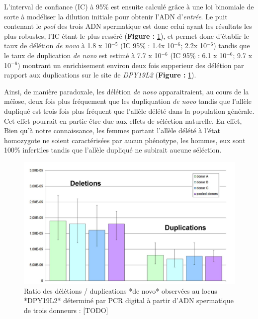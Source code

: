 \documentclass[12pt,twoside]{reedthesis}
\theoremstyle{definition}
\theoremstyle{definition}
\theoremstyle{remark}
\begin{document}
  L'interval de confiance (IC) à 95\% est ensuite calculé grâce à une loi
  binomiale de sorte à modéliser la dilution initiale pour obtenir l'ADN
  d'\emph{entrée}. Le puit contenant le \emph{pool} des trois ADN
  spermatique est donc celui ayant les résultats les plus robustes, l'IC
  étant le plus resséré (\textbf{Figure : }\ref{fig:dupdelrate}), et
  permet donc d'établir le taux de délétion \emph{de novo} à 1.8 x
  10\(^{-5}\) (IC 95\% : 1.4x 10\(^{-6}\); 2.2x 10\(^{-6}\)) tandis que le
  taux de duplication \emph{de novo} est estimé à 7.7 x 10\(^{-6}\) (IC
  95\% : 6.1 x 10\(^{-6}\); 9.7 x 10\(^{-6}\)) montrant un enrichisement
  environ deux fois supperieur des délétion par rapport aux duplications
  sur le site de \emph{DPY19L2} (\textbf{Figure : }\ref{fig:dupdelrate}).
  
  Ainsi, de manière paradoxale, les délétion \emph{de novo}
  apparaitraient, au cours de la méïose, deux fois plus fréquement que les
  dupliquation \emph{de novo} tandis que l'allèle dupliqué est trois fois
  plus fréquent que l'allèle délété dans la population générale. Cet effet
  pourrait en partie être due aux effets de séléction naturelle. En effet,
  Bien qu'à notre connaissance, les femmes portant l'allèle délété à
  l'état homozygote ne soient caractérisées par aucun phénotype, les
  hommes, eux sont 100\% infertiles tandis que l'allèle dupliqué ne
  subirait aucune séléction.
  
  \begin{figure}
  
  {\centering \includegraphics[scale=0.38]{figure/globo_du_del_rate} 
  
  }
  
  \caption[Ratio des délétions / duplications *de novo* observées au locus *DPY19L2* déterminé par PCR digital à partir d'ADN spermatique de trois donneurs]{Ratio des délétions / duplications *de novo* observées au locus *DPY19L2* déterminé par PCR digital à partir d'ADN spermatique de trois donneurs : [TODO]}\label{fig:dupdelrate}
  \end{figure}
  
\end{document}
